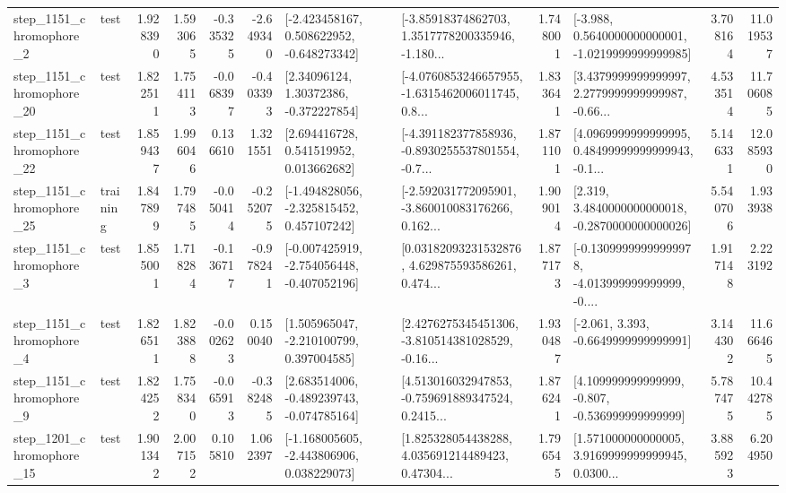 \begin{tabular}{llrrrrllrlrr}
  step\_1151\_chromophore\_2 &      test &      1.928390 &    1.593065 &     -0.335325 & -2.649340 &   [-2.423458167, 0.508622952, -0.648273342] &  [-3.85918374862703, 1.3517778200335946, -1.180... &       1.748001 &  [-3.988, 0.5640000000000001, -1.0219999999999985] &            3.708164 &         11.019537 \\
 step\_1151\_chromophore\_20 &      test &      1.822511 &    1.754113 &     -0.068397 & -0.403393 &      [2.34096124, 1.30372386, -0.372227854] &  [-4.0760853246657955, -1.6315462006011745, 0.8... &       1.833641 &  [3.4379999999999997, 2.2779999999999987, -0.66... &            4.533514 &         11.706085 \\
 step\_1151\_chromophore\_22 &      test &      1.859437 &    1.996046 &      0.136610 &  1.321551 &     [2.694416728, 0.541519952, 0.013662682] &  [-4.391182377858936, -0.8930255537801554, -0.7... &       1.871101 &  [4.0969999999999995, 0.48499999999999943, -0.1... &            5.146331 &         12.085930 \\
 step\_1151\_chromophore\_25 &  training &      1.847899 &    1.797485 &     -0.050414 & -0.252075 &   [-1.494828056, -2.325815452, 0.457107242] &  [-2.592031772095901, -3.860010083176266, 0.162... &       1.909014 &   [2.319, 3.4840000000000018, -0.2870000000000026] &            5.540706 &          1.933938 \\
  step\_1151\_chromophore\_3 &      test &      1.855001 &    1.718284 &     -0.136717 & -0.978241 &  [-0.007425919, -2.754056448, -0.407052196] &  [0.03182093231532876, 4.629875593586261, 0.474... &       1.877173 &  [-0.13099999999999978, -4.013999999999999, -0.... &            1.917148 &          2.223192 \\
  step\_1151\_chromophore\_4 &      test &      1.826511 &    1.823888 &     -0.002623 &  0.150040 &    [1.505965047, -2.210100799, 0.397004585] &  [2.4276275345451306, -3.810514381028529, -0.16... &       1.930487 &               [-2.061, 3.393, -0.6649999999999991] &            3.144302 &         11.666465 \\
  step\_1151\_chromophore\_9 &      test &      1.824252 &    1.758340 &     -0.065913 & -0.382485 &   [2.683514006, -0.489239743, -0.074785164] &  [4.513016032947853, -0.759691889347524, 0.2415... &       1.876241 &    [4.109999999999999, -0.807, -0.536999999999999] &            5.787475 &         10.442785 \\
 step\_1201\_chromophore\_15 &      test &      1.901342 &    2.007152 &      0.105810 &  1.062397 &   [-1.168005605, -2.443806906, 0.038229073] &  [1.825328054438288, 4.035691214489423, 0.47304... &       1.796545 &  [1.571000000000005, 3.9169999999999945, 0.0300... &            3.885923 &          6.204950 \\

\end{tabular}
